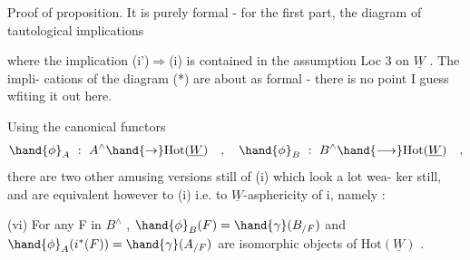 Proof of proposition.   It is purely formal  -  for the first part,
 the diagram of tautological implications
 \hand{,}

where the implication  (i')$\Rightarrow$(i)  is contained in the assumption Loc 3
on $\underline{W}$ .   The impli-%
cations of the diagram  (*)  are about as formal  -  there is no point I
guess wfiting it out here.

\hand{\uline{\textcolor{black}{Remark 2}}}   Using the canonical functors
\[ \hand{\phi}_A \ : \ A^{\wedge} \hand{\to} \mathrm{Hot}(\underline{W}) \quad , \quad \hand{\phi}_B \ : \ B^{\wedge} \hand{\longrightarrow} \mathrm{Hot}(\underline{W}) \quad , \]
there are two other amusing versions still of (i)\hand{,} which  look a lot wea-%
ker still,  and are equivalent however to (i) i.e. to $\underline{W}$-asphericity of i,
namely :

(vi)    For any F in $B^{\wedge}$ ,  $\hand{\phi}_B(F) = \hand{\gamma}(B_{/F})$  and  $\hand{\phi}_A(i^{*}(F)) = \hand{\gamma}(A_{/F})$
are isomorphic objects of  $\mathrm{Hot}(\underline{W})$ .

